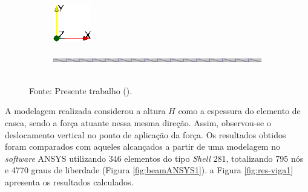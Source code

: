 \begin{figure}[h!]
    \centering
    \caption{Viga engastada em problema dinâmico - Malha utilizada.}
    \begin{subfigure}{0.05\textwidth}
        \includegraphics[width=\linewidth]{Figuras/vigas/eixos1.png}
    \end{subfigure}
    \begin{subfigure}{0.94\textwidth}
        \includegraphics[width=\linewidth]{Figuras/vigas/mesh1.png}
    \end{subfigure}
    \\Fonte: Presente trabalho (\the\year).
    \label{fig:viga1-mesh}
\end{figure}

A modelagem realizada considerou a altura $H$ como a espessura do elemento de casca, sendo a força atuante nessa mesma direção. Assim, observou-se o deslocamento vertical no ponto de aplicação da força. Os resultados obtidos foram comparados com aqueles alcançados a partir de uma modelagem no \textit{software} ANSYS utilizando 346 elementos do tipo \textit{Shell} 281, totalizando 795 nós e 4770 graus de liberdade (Figura \ref{fig:beamANSYS1}). a Figura \ref{fig:res-viga1} apresenta os resultados calculados.

